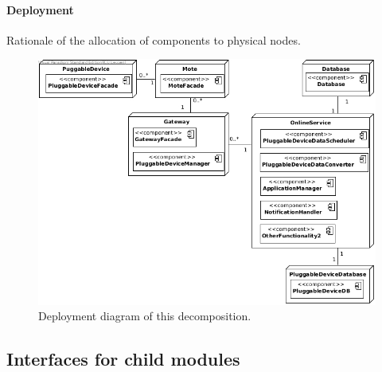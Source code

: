     \paragraph{Deployment}
        Rationale of the allocation of components to physical nodes.

        \begin{figure}[!htp]
        	\centering
        	\includegraphics[width=1.00\textwidth]{deployment-diagram-2}
        	\caption{Deployment diagram of this decomposition.
        	}\label{fig:it1-depl_main}
        \end{figure}


\subsection{Interfaces for child modules}

